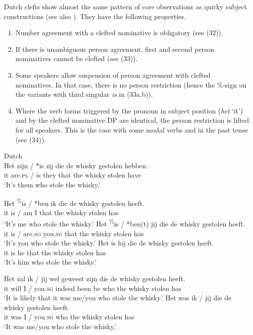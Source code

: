 \documentclass[output=paper]{langsci/langscibook}
\begin{document}
Dutch clefts show almost the same pattern of core observations as  quirky subject constructions (see also \citealt{Dikken2014}). They have the following properties. 

\begin{enumerate}[label=(\roman*)]
\item  Number agreement with a clefted nominative is obligatory (see (32)). 
\item  If there is unambiguous person agreement, first and second person nominatives cannot be clefted (see (33)). 
\item Some speakers allow suspension of person agreement with clefted nominatives. In that case, there is no person restriction (hence the \%-sign on the variants with third singular \textit{is} in (33a,b)). 
\item  Where the verb forms triggered by the pronoun in subject position (\textit{het} ‘it’) and by the clefted nominative DP are identical, the person restriction is lifted for all speakers. This is the case with some modal verbs and in the past tense (see (34)).
\end{enumerate}

\ea \label{bkm:Ref295486016}  Dutch\\
 \gll Het zijn / *is   zij   die   de whisky gestolen hebben.\\
    it    are.\textsc{pl} / is they that the whisky stolen     have\\
\glt   ‘It’s them who stole the whisky.’  
\z

\ea \label{bkm:Ref295486091}  
\ea \gll Het \textsuperscript{\%}is / *ben ik die  de  whisky gestolen heeft.\\
    it       is / am    I  that the whisky stolen      has\\
\glt    ‘It’s me who stole the whisky.’
\ex 
\gll Het \textsuperscript{\%}is / *ben(t) jij         die  de  whisky gestolen heeft.\\
    it      is / are.\textsc{sg}   you.\textsc{sg} that the whisky stolen      has\\
\glt    ‘It’s you who stole the whisky.’
\ex 
\gll Het is hij die  de  whisky gestolen heeft.\\
    it     is he that the whisky stolen     has\\
\glt  ‘It’s him who stole the whisky.’
\z
\z


\ea \label{bkm:Ref295486338}  
\ea \gll Het zal  ik / jij      wel      geweest zijn die  de  whisky gestolen heeft.\\
    it    will I / you.\textsc{sg} indeed been      be   who the whisky stolen     has\\
\glt    ‘It is likely that it was me/you who stole the whisky.’
\ex \gll  Het was ik / jij        die  de  whisky gestolen heeft.\\
    it     was I / you.\textsc{sg} who the whisky stolen      has\\
\glt  ‘It was me/you who stole the whisky.’
\z
\z
\end{document}
